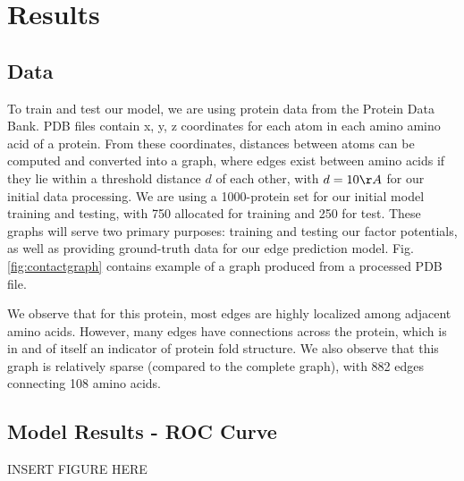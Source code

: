 \documentclass{article}
\begin{document}


\section{Results}

\subsection{Data}
To train and test our model, we are using protein data from the Protein Data Bank. PDB files contain x, y, z coordinates for each atom in each amino amino acid of a protein. From these coordinates, distances between atoms can be computed and converted into a graph, where edges exist between amino acids if they lie within a threshold distance $d$ of each other, with $d = 10 {\AA}$ for our initial data processing. We are using a 1000-protein set for our initial model training and testing, with 750 allocated for training and 250 for test. These graphs will serve two primary purposes: training and testing our factor potentials, as well as providing ground-truth data for our edge prediction model. Fig. \ref{fig:contactgraph} contains example of a graph produced from a processed PDB file. 

 
We observe that for this protein, most edges are highly localized among adjacent amino acids. However, many edges have connections across the protein, which is in and of itself an indicator of protein fold structure. We also observe that this graph is relatively sparse (compared to the complete graph), with 882 edges connecting 108 amino acids. 

\subsection{Model Results - ROC Curve}



INSERT FIGURE HERE
\end{document}
